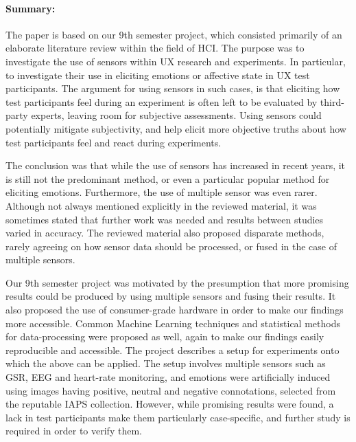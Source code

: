\paragraph{Summary:}

The paper is based on our 9th semester project, which consisted primarily of an
elaborate literature review within the field of HCI. The purpose was to
investigate the use of sensors within UX research and experiments. In
particular, to investigate their use in eliciting emotions or affective state in
UX test participants. The argument for using sensors in such cases, is that
eliciting how test participants feel during an experiment is often left to be
evaluated by third-party experts, leaving room for subjective assessments. Using
sensors could potentially mitigate subjectivity, and help elicit more objective
truths about how test participants feel and react during experiments.

The conclusion was that while the use of sensors has increased in recent years,
it is still not the predominant method, or even a particular popular method for
eliciting emotions. Furthermore, the use of multiple sensor was even
rarer. Although not always mentioned explicitly in the reviewed material, it was
sometimes stated that further work was needed and results between studies varied
in accuracy. The reviewed material also proposed disparate methods, rarely
agreeing on how sensor data should be processed, or fused in the case of
multiple sensors.

Our 9th semester project was motivated by the presumption that more promising
results could be produced by using multiple sensors and fusing their results. It
also proposed the use of consumer-grade hardware in order to make our findings
more accessible. Common Machine Learning techniques and statistical methods for
data-processing were proposed as well, again to make our findings easily
reproducible and accessible. The project describes a setup for experiments onto
which the above can be applied. The setup involves multiple sensors such as GSR,
EEG and heart-rate monitoring, and emotions were artificially induced using
images having positive, neutral and negative connotations, selected from the
reputable IAPS collection. However, while promising results were found, a lack
in test participants make them particularly case-specific, and further study is
required in order to verify them.

